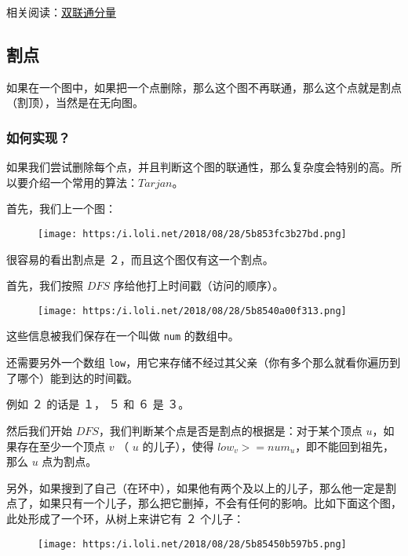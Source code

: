 
相关阅读：\href{/graph/bcc/}{双联通分量}

\subsection{割点}

\begin{QUOTE}{}{}
如果在一个图中，如果把一个点删除，那么这个图不再联通，那么这个点就是割点（割顶），当然是在无向图。
\end{QUOTE}

\subsubsection{如何实现？}

如果我们尝试删除每个点，并且判断这个图的联通性，那么复杂度会特别的高。所以要介绍一个常用的算法：$Tarjan$。

首先，我们上一个图：

\begin{figure}[h]
\centering
\texttt{[image: https:/i.loli.net/2018/08/28/5b853fc3b27bd.png]} 

\end{figure}

很容易的看出割点是 ２，而且这个图仅有这一个割点。

首先，我们按照 $DFS$ 序给他打上时间戳（访问的顺序）。

\begin{figure}[h]
\centering
\texttt{[image: https:/i.loli.net/2018/08/28/5b8540a00f313.png]} 

\end{figure}

这些信息被我们保存在一个叫做 \texttt{num} 的数组中。

还需要另外一个数组 \texttt{low}，用它来存储不经过其父亲（你有多个那么就看你遍历到了哪个）能到达的时间戳。

例如 ２ 的话是 １， ５ 和 ６ 是 ３。

然后我们开始 $DFS$，我们判断某个点是否是割点的根据是：对于某个顶点 $u$，如果存在至少一个顶点 $v$ （ $u$ 的儿子），使得 $low_v>=num_u$，即不能回到祖先，那么 $u$ 点为割点。

另外，如果搜到了自己（在环中），如果他有两个及以上的儿子，那么他一定是割点了，如果只有一个儿子，那么把它删掉，不会有任何的影响。比如下面这个图，此处形成了一个环，从树上来讲它有 ２ 个儿子：

\begin{figure}[h]
\centering
\texttt{[image: https:/i.loli.net/2018/08/28/5b85450b597b5.png]} 

\end{figure} 

